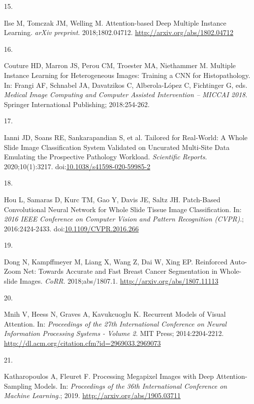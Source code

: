 \documentclass[
  12pt,
  a5,margin=2cmpaper,
]{article}
\newlength{\cslhangindent}
\newlength{\csllabelwidth}
\newlength{\cslentryspacingunit} %
\newenvironment{CSLReferences}[2] %
 {%
  \setlength{\parindent}{0pt}
  \ifodd #1
  \let\oldpar\par
  \def\par{\hangindent=\cslhangindent\oldpar}
  \fi
  \setlength{\parskip}{#2\cslentryspacingunit}
 }%
 {}
\newcommand{\CSLLeftMargin}[1]{\parbox[t]{\csllabelwidth}{#1}}
\newcommand{\CSLRightInline}[1]{\parbox[t]{\linewidth - \csllabelwidth}{#1}\break}
\begin{document}
\begin{CSLReferences}{0}{0}
\leavevmode{}%
\CSLLeftMargin{15. }%
\CSLRightInline{Ilse M, Tomczak JM, Welling M. {Attention-based Deep
Multiple Instance Learning}. \emph{arXiv preprint}. 2018;1802.04712.
\url{http://arxiv.org/abs/1802.04712}}

\leavevmode{}%
\CSLLeftMargin{16. }%
\CSLRightInline{Couture HD, Marron JS, Perou CM, Troester MA, Niethammer
M. {Multiple Instance Learning for Heterogeneous Images: Training a CNN
for Histopathology}. In: Frangi AF, Schnabel JA, Davatzikos C,
Alberola-López C, Fichtinger G, eds. \emph{Medical Image Computing and
Computer Assisted Intervention -- MICCAI 2018}. Springer International
Publishing; 2018:254-262.}

\leavevmode{}%
\CSLLeftMargin{17. }%
\CSLRightInline{Ianni JD, Soans RE, Sankarapandian S, et al. {Tailored
for Real-World: A Whole Slide Image Classification System Validated on
Uncurated Multi-Site Data Emulating the Prospective Pathology Workload}.
\emph{Scientific Reports}. 2020;10(1):3217.
doi:\href{https://doi.org/10.1038/s41598-020-59985-2}{10.1038/s41598-020-59985-2}}

\leavevmode{}%
\CSLLeftMargin{18. }%
\CSLRightInline{Hou L, Samaras D, Kurc TM, Gao Y, Davis JE, Saltz JH.
{Patch-Based Convolutional Neural Network for Whole Slide Tissue Image
Classification}. In: \emph{2016 IEEE Conference on Computer Vision and
Pattern Recognition (CVPR)}.; 2016:2424-2433.
doi:\href{https://doi.org/10.1109/CVPR.2016.266}{10.1109/CVPR.2016.266}}

\leavevmode{}%
\CSLLeftMargin{19. }%
\CSLRightInline{Dong N, Kampffmeyer M, Liang X, Wang Z, Dai W, Xing EP.
{Reinforced Auto-Zoom Net: Towards Accurate and Fast Breast Cancer
Segmentation in Whole-slide Images}. \emph{CoRR}. 2018;abs/1807.1.
\url{http://arxiv.org/abs/1807.11113}}

\leavevmode{}%
\CSLLeftMargin{20. }%
\CSLRightInline{Mnih V, Heess N, Graves A, Kavukcuoglu K. {Recurrent
Models of Visual Attention}. In: \emph{Proceedings of the 27th
International Conference on Neural Information Processing Systems -
Volume 2}. MIT Press; 2014:2204-2212.
\url{http://dl.acm.org/citation.cfm?id=2969033.2969073}}

\leavevmode{}%
\CSLLeftMargin{21. }%
\CSLRightInline{Katharopoulos A, Fleuret F. {Processing Megapixel Images
with Deep Attention-Sampling Models}. In: \emph{Proceedings of the 36th
International Conference on Machine Learning}.; 2019.
\url{http://arxiv.org/abs/1905.03711}}


\end{CSLReferences}
\end{document}
